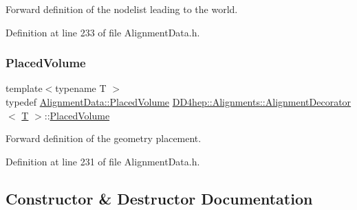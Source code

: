 Forward definition of the nodelist leading to the world. 



Definition at line 233 of file Alignment\+Data.\+h.

\hypertarget{class_d_d4hep_1_1_alignments_1_1_alignment_decorator_a3dc9016a6686627ec2e6584aed9c8eeb}{}\label{class_d_d4hep_1_1_alignments_1_1_alignment_decorator_a3dc9016a6686627ec2e6584aed9c8eeb} 
\subsubsection{\texorpdfstring{Placed\+Volume}{PlacedVolume}}
{\footnotesize\ttfamily template$<$typename T $>$ \\
typedef \hyperlink{class_d_d4hep_1_1_alignments_1_1_alignment_data_aab2d43f5a4a4c2163e0a04905306525a}{Alignment\+Data\+::\+Placed\+Volume} \hyperlink{class_d_d4hep_1_1_alignments_1_1_alignment_decorator}{D\+D4hep\+::\+Alignments\+::\+Alignment\+Decorator}$<$ \hyperlink{class_t}{T} $>$\+::\hyperlink{class_d_d4hep_1_1_alignments_1_1_alignment_decorator_a3dc9016a6686627ec2e6584aed9c8eeb}{Placed\+Volume}}



Forward definition of the geometry placement. 



Definition at line 231 of file Alignment\+Data.\+h.



\subsection{Constructor \& Destructor Documentation}
\hypertarget{class_d_d4hep_1_1_alignments_1_1_alignment_decorator_af15dc8788db4b9f8ffdaa366b88bd85b}{}\label{class_d_d4hep_1_1_alignments_1_1_alignment_decorator_af15dc8788db4b9f8ffdaa366b88bd85b} 
